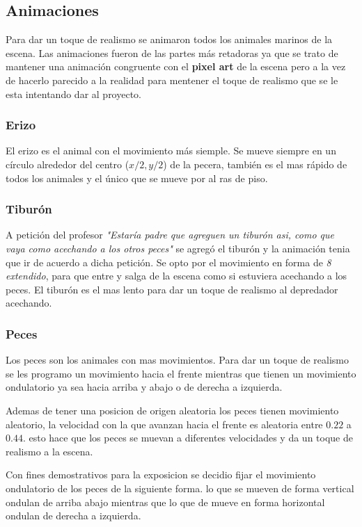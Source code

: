\documentclass[10pt, a4paper, twocolumn]{article}
\begin{document}
\subsection{Animaciones}
Para dar un toque de realismo se animaron todos los animales marinos de la escena. Las animaciones fueron de las partes más retadoras ya que se trato de mantener una animación congruente con el \textbf{pixel art} de la escena pero a la vez de hacerlo parecido a la realidad para mentener el toque de realismo que se le esta intentando dar al proyecto.

\subsubsection{Erizo}
El erizo es el animal con el movimiento más siemple. Se mueve siempre en un círculo alrededor del centro ($x/2,y/2$) de la pecera, también es el mas rápido de todos los animales y el único que se mueve por al ras de piso.

\subsubsection{Tiburón}
A petición del profesor \textit{"Estaría padre que agreguen un tiburón asi, como que vaya como acechando a los otros peces"} se agregó el tiburón y la animación tenia que ir de acuerdo a dicha petición. Se opto por el movimiento en forma de \textit{8 extendido}, para que entre y salga de la escena como si estuviera acechando a los peces. El tiburón es el mas lento para dar un toque de realismo al depredador acechando.

 \subsubsection{Peces}
Los peces son los animales con mas movimientos. Para dar un toque de realismo se les programo un movimiento hacia el frente mientras que tienen un movimiento ondulatorio ya sea hacia arriba y abajo o de derecha a izquierda. 
 
Ademas de tener una posicion de origen aleatoria los peces tienen movimiento aleatorio, la velocidad con la que avanzan hacia el frente es aleatoria entre $0.22$ a $0.44$. esto hace que los peces se muevan a diferentes velocidades y da un toque de realismo a la escena.

Con fines demostrativos para la exposicion se decidio fijar el movimiento ondulatorio de los peces de la siguiente forma. lo que se mueven de forma vertical ondulan de arriba abajo mientras que lo que de mueve en forma horizontal ondulan de derecha a izquierda. 
\end{document}
